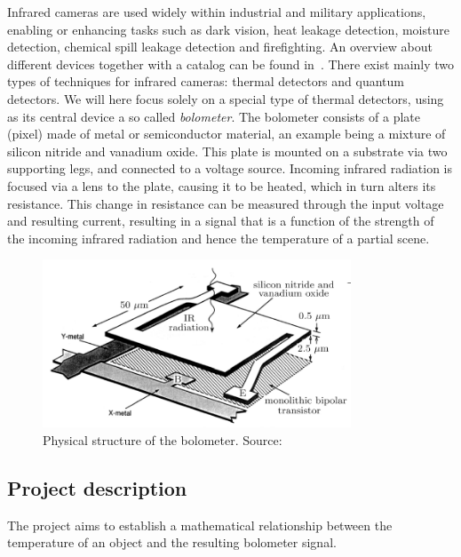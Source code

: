 Infrared cameras are used widely within industrial and military
applications, enabling or enhancing tasks such as dark vision, heat
leakage detection, moisture detection, chemical spill leakage
detection and firefighting. An overview about different devices
together with a catalog can be found in~\cite{flir_handbook}. There
exist mainly two types of techniques for infrared cameras: thermal
detectors and quantum detectors. We will here focus solely on a
special type of thermal detectors, using as its central device a so
called \textit{bolometer}. The bolometer consists of a plate (pixel)
made of metal or semiconductor material, an example being a mixture of
silicon nitride and vanadium oxide. This plate is mounted on a
substrate via two supporting legs, and connected to a voltage
source. Incoming infrared radiation is focused via a lens to the
plate, causing it to be heated, which in turn alters its
resistance. This change in resistance can be measured through the
input voltage and resulting current, resulting in a signal that is a
function of the strength of the incoming infrared radiation and hence
the temperature of a partial scene.

\begin{figure}[h]
\begin{center}
\includegraphics[height=5cm]{gfx/pixel1.png}
\caption{Physical structure of the bolometer. Source: ~\cite{xiu2010research}}
\end{center}
\end{figure}

\subsection{Project description}
The project aims to establish a mathematical relationship between the temperature of an object and the resulting bolometer signal.

